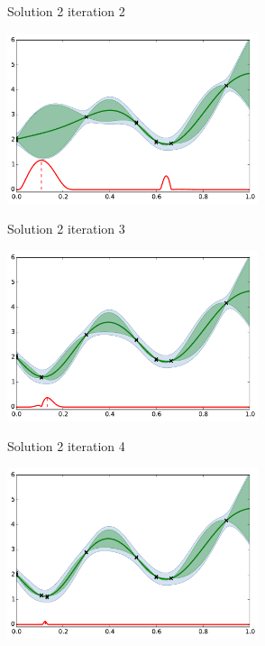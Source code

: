 \documentclass{beamer}
\begin{document}
\begin{frame}[noframenumbering]{Solution 2}
iteration 2
\begin{center}
\includegraphics[height=5cm]{figures/python/ego_EI1n2}
\end{center}
\end{frame}

\begin{frame}[noframenumbering]{Solution 2}
iteration 3
\begin{center}
\includegraphics[height=5cm]{figures/python/ego_EI1n3}
\end{center}
\end{frame}

\begin{frame}[noframenumbering]{Solution 2}
iteration 4
\begin{center}
\includegraphics[height=5cm]{figures/python/ego_EI1n4}
\end{center}
\end{frame}
\end{document}
